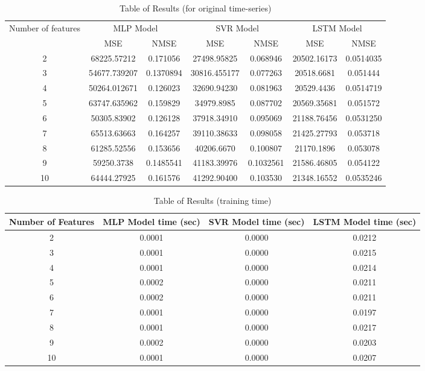 \documentclass{article}
\begin{document}
\begin{table}[h]
	\begin{tabular}{ccccccc}
		\toprule
		\multirow{2}{*}{Number of features} & \multicolumn{2}{c}{MLP Model} & \multicolumn{2}{c}{SVR Model} & \multicolumn{2}{c}{LSTM Model} \\ 
		\cmidrule {2-7} & MSE & NMSE & MSE & NMSE & MSE & NMSE  \\
		\midrule
		2 & 68225.57212 & 0.171056 & 27498.95825 & 0.068946 & 20502.16173 & 0.0514035 \\
		\midrule
		3 & 54677.739207 & 0.1370894 & 30816.455177 & 0.077263 & 20518.6681 & 0.051444 \\
		\midrule
		4 & 50264.012671 & 0.126023 & 32690.94230 & 0.081963 & 20529.4436 & 0.0514719 \\
		\midrule
		5 & 63747.635962 & 0.159829 & 34979.8985 & 0.087702 & 20569.35681 & 0.051572 \\
		\midrule
		6 & 50305.83902 & 0.126128 & 37918.34910 & 0.095069 & 21188.76456 & 0.0531250 \\
		\midrule
		7 & 65513.63663 & 0.164257 & 39110.38633 & 0.098058 & 21425.27793 & 0.053718 \\
		\midrule
		8 & 61285.52556 & 0.153656 & 40206.6670 & 0.100807 & 21170.1896 & 0.053078 \\
		\midrule
		9 & 59250.3738 & 0.1485541 & 41183.39976 & 0.1032561 & 21586.46805 & 0.054122 \\
		\midrule
		10 & 64444.27925 & 0.161576 & 41292.90400 & 0.103530 & 21348.16552 & 0.0535246 \\
		\bottomrule
	\end{tabular}
	\caption{Table of Results (for original time-series)}
\end{table}

\begin{table}[ht]
	\begin{tabular}{cccc}
		\toprule
		Number of Features & MLP Model time (sec) & SVR Model time (sec) & LSTM Model time (sec) \\
		\midrule 
		2 & 0.0001 & 0.0000 & 0.0212 \\ 
		\midrule
		3 & 0.0001 & 0.0000 & 0.0215 \\
		\midrule
		4 & 0.0001 & 0.0000 & 0.0214 \\
		\midrule
		5 & 0.0002 & 0.0000 & 0.0211 \\
		\midrule
		6 & 0.0002 & 0.0000 & 0.0211 \\
		\midrule
		7 & 0.0001 & 0.0000 & 0.0197 \\
		\midrule
		8 & 0.0001 & 0.0000 & 0.0217 \\
		\midrule
		9 & 0.0002 & 0.0000 & 0.0203 \\
		\midrule
		10 & 0.0001 & 0.0000 & 0.0207 \\
		\bottomrule
	\end{tabular}
	\caption{Table of Results (training time)}
\end{table}
\end{document}
